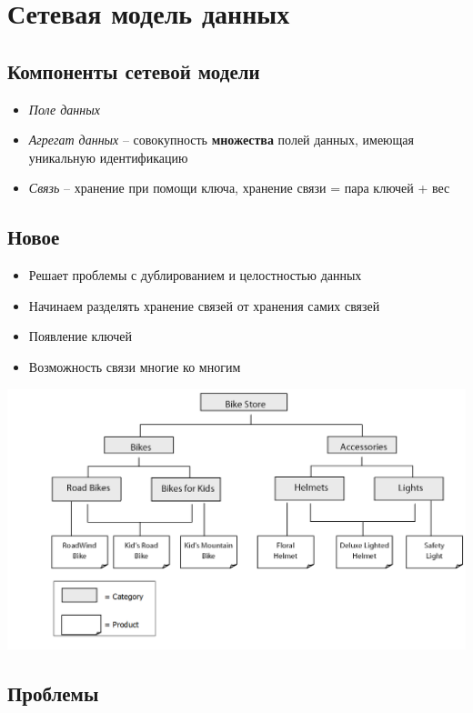 \documentclass[12pt, a4paper]{article}
\begin{document}
\section{Сетевая модель данных}
\subsection{Компоненты сетевой модели}

\begin{itemize}
    \item \emph{Поле данных}
    \item \emph{Агрегат данных} -- совокупность \textbf{множества} полей данных, имеющая уникальную идентификацию
    \item \emph{Связь} -- хранение при помощи ключа, хранение связи = пара ключей + вес
\end{itemize}

\subsection{Новое}

\begin{itemize}
    \item Решает проблемы с дублированием и целостностью данных
    \item Начинаем разделять хранение связей от хранения самих связей
    \item Появление ключей
    \item Возможность связи многие ко многим
\end{itemize}

\includegraphics[scale=0.8]{data/network.jpeg}

\subsection{Проблемы}
\end{document}
